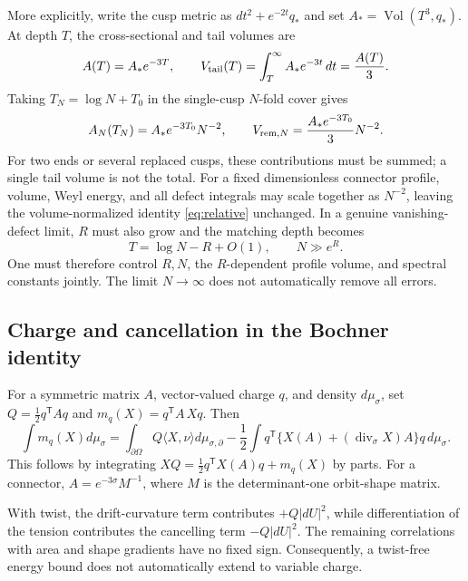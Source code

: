 \documentclass[a4paper,11pt]{article}
\numberwithin{equation}{section}
\theoremstyle{definition}
\newcommand{\Vol}{\operatorname{Vol}}
\begin{document}
More explicitly, write the cusp metric as $dt^2+e^{-2t}q_*$ and set $A_*=\Vol(T^3,q_*)$.
At depth $T$, the cross-sectional and tail volumes are
\begin{equation}\label{eq:cusp-tail}
 A(T)=A_*e^{-3T},\qquad
 V_{\rm tail}(T)=\int_T^\infty A_*e^{-3t}\,dt=\frac{A(T)}3.
\end{equation}
Taking $T_N=\log N+T_0$ in the single-cusp $N$-fold cover gives
\begin{equation}\label{eq:cusp-cover-scale}
 A_N(T_N)=A_*e^{-3T_0}N^{-2},\qquad
 V_{{\rm rem},N}=\frac{A_*e^{-3T_0}}3N^{-2}.
\end{equation}
For two ends or several replaced cusps, these contributions must be summed; a single tail volume is not the total.
For a fixed dimensionless connector profile, volume, Weyl energy, and all defect integrals may scale together as $N^{-2}$, leaving the volume-normalized identity \eqref{eq:relative} unchanged.
In a genuine vanishing-defect limit, $R$ must also grow and the matching depth becomes
\begin{equation}\label{eq:RN}
T=\log N-R+O(1),\qquad N\gg e^R.
\end{equation}
One must therefore control $R,N$, the $R$-dependent profile volume, and spectral constants jointly. The limit $N\to\infty$ does not automatically remove all errors.

\subsection{Charge and cancellation in the Bochner identity}
For a symmetric matrix $A$, vector-valued charge $q$, and density $d\mu_\sigma$, set
$Q=\frac12q^{\mathsf T}Aq$ and $m_q(X)=q^{\mathsf T}A\,Xq$. Then
\begin{equation}\label{eq:charge}
\int m_q(X)d\mu_\sigma=
\int_{\partial\Omega}Q\langle X,\nu\rangle d\mu_{\sigma,\partial}
-\frac12\int q^{\mathsf T}\{X(A)+(\operatorname{div}_\sigma X)A\}q\,d\mu_\sigma.
\end{equation}
This follows by integrating $XQ=\frac12q^{\mathsf T}X(A)q+m_q(X)$ by parts.
For a connector, $A=e^{-3\sigma}M^{-1}$, where $M$ is the determinant-one orbit-shape matrix.

With twist, the drift-curvature term contributes $+Q|dU|^2$, while differentiation of the tension contributes the cancelling term $-Q|dU|^2$.
The remaining correlations with area and shape gradients have no fixed sign.
Consequently, a twist-free energy bound does not automatically extend to variable charge.
\end{document}
